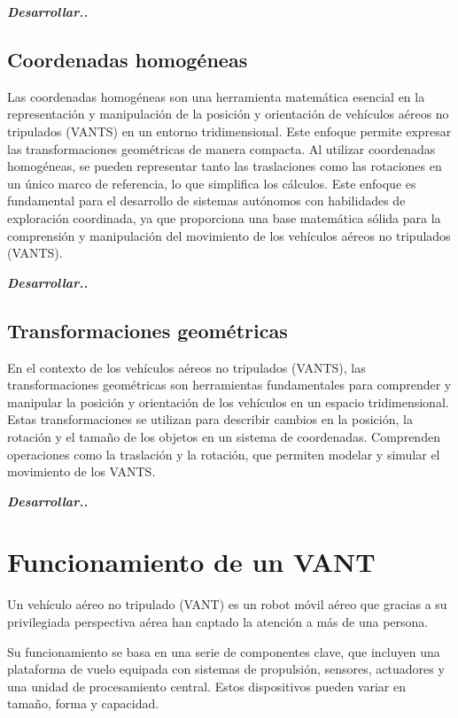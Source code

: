 \textit{\textbf{Desarrollar..}}

\subsection*{Coordenadas homogéneas}

Las coordenadas homogéneas son una herramienta matemática esencial en la representación y manipulación de la posición y orientación de vehículos aéreos no tripulados (VANTS) en un entorno tridimensional. Este enfoque permite expresar las transformaciones geométricas de manera compacta. Al utilizar coordenadas homogéneas, se pueden representar tanto las traslaciones como las rotaciones en un único marco de referencia, lo que simplifica los cálculos. Este enfoque es fundamental para el desarrollo de sistemas autónomos con habilidades de exploración coordinada, ya que proporciona una base matemática sólida para la comprensión y manipulación del movimiento de los vehículos aéreos no tripulados (VANTS).

\textit{\textbf{Desarrollar..}}

\subsection*{Transformaciones geométricas}

En el contexto de los vehículos aéreos no tripulados (VANTS), las transformaciones geométricas son herramientas fundamentales para comprender y manipular la posición y orientación de los vehículos en un espacio tridimensional. Estas transformaciones se utilizan para describir cambios en la posición, la rotación y el tamaño de los objetos en un sistema de coordenadas. Comprenden operaciones como la traslación y la rotación, que permiten modelar y simular el movimiento de los VANTS. 

\textit{\textbf{Desarrollar..}}

\section{Funcionamiento de un VANT}

Un vehículo aéreo no tripulado (VANT) es un robot móvil aéreo que gracias a su privilegiada perspectiva aérea han captado la atención a más de una persona.

Su funcionamiento se basa en una serie de componentes clave, que incluyen una plataforma de vuelo equipada con sistemas de propulsión, sensores, actuadores y una unidad de procesamiento central. Estos dispositivos pueden variar en tamaño, forma y capacidad.

